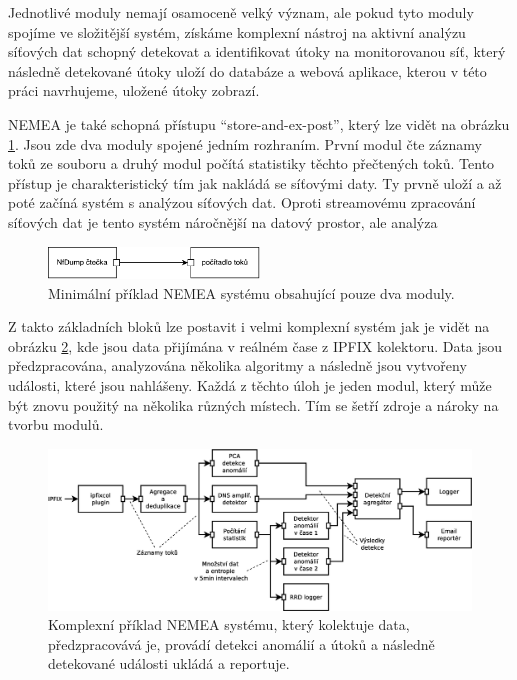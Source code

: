 Jednotlivé moduly nemají osamoceně velký význam, ale pokud tyto moduly spojíme ve složitější systém, získáme komplexní nástroj na aktivní analýzu síťových dat schopný detekovat a identifikovat útoky na monitorovanou síť, který následně detekované útoky uloží do databáze a webová aplikace, kterou v této práci navrhujeme, uložené útoky zobrazí.

NEMEA je také schopná přístupu ``store-and-ex-post'', který lze vidět na obrázku \ref{fig:nemea-schema}. Jsou zde dva moduly spojené jedním rozhraním. První modul čte záznamy toků ze souboru a druhý modul počítá statistiky těchto přečtených toků. Tento přístup je charakteristický tím jak nakládá se síťovými daty. Ty prvně uloží a až poté začíná systém s analýzou síťových dat. Oproti streamovému zpracování síťových dat je tento systém náročnější na datový prostor, ale analýza 
\begin{figure}[ht]
    \centering
    \includegraphics[width=0.5\textwidth]{fig/nemea-basic.pdf}
    \caption{Minimální příklad NEMEA systému obsahující pouze dva moduly.} \label{fig:nemea-schema}
  
\end{figure}

Z takto základních bloků lze postavit i velmi komplexní systém jak je vidět na obrázku \ref{fig:nemea-example-2}, kde jsou data přijímána v reálném čase z IPFIX\cite{ipfix} kolektoru. Data jsou předzpracována, analyzována několika algoritmy a následně jsou vytvořeny události, které jsou nahlášeny. Každá z těchto úloh je jeden modul, který může být znovu použitý na několika různých místech. Tím se šetří zdroje a nároky na tvorbu modulů.

\begin{figure}
    \centering
    \includegraphics[width=1\textwidth]{fig/nemea-example-2-cz.eps}
    \caption{Komplexní příklad NEMEA systému, který kolektuje data, předzpracovává je, provádí detekci anomálií a útoků a následně detekované události ukládá a reportuje.} \label{fig:nemea-example-2}
  
\end{figure}


